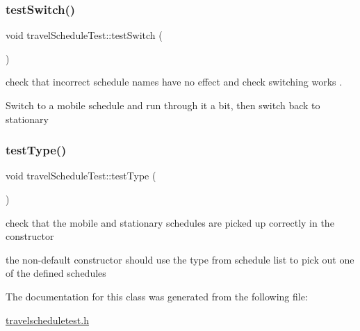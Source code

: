 \subsubsection{\texorpdfstring{test\+Switch()}{testSwitch()}}
{\footnotesize\ttfamily void travel\+Schedule\+Test\+::test\+Switch (\begin{DoxyParamCaption}{ }\end{DoxyParamCaption})\hspace{0.3cm}{\ttfamily [inline]}}



check that incorrect schedule names have no effect and check switching works . 

Switch to a mobile schedule and run through it a bit, then switch back to stationary ~\newline
\mbox{\label{classtravelScheduleTest_a66b5ac55f22c6d892798936d634d2316}} 
\subsubsection{\texorpdfstring{test\+Type()}{testType()}}
{\footnotesize\ttfamily void travel\+Schedule\+Test\+::test\+Type (\begin{DoxyParamCaption}{ }\end{DoxyParamCaption})\hspace{0.3cm}{\ttfamily [inline]}}



check that the mobile and stationary schedules are picked up correctly in the constructor 

the non-\/default constructor should use the type from schedule list to pick out one of the defined schedules 

The documentation for this class was generated from the following file\+:\begin{DoxyCompactItemize}
\item 
\mbox{\hyperlink{travelscheduletest_8h}{travelscheduletest.\+h}}\end{DoxyCompactItemize}
